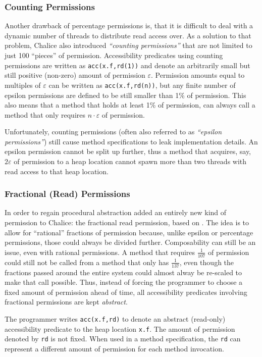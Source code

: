 \subsubsection{Counting Permissions}
Another drawback of percentage permissions is, that it is difficult to deal with a dynamic number of threads to distribute read access over.
As a solution to that problem, Chalice also introduced \emph{``counting permissions''} that are not limited to just 100 ``pieces'' of permission.
Accessibility predicates using counting permissions are written as \lstinline!acc(x.f,rd(1))! and denote an arbitrarily small but still positive (non-zero) amount of permission $\varepsilon$. 
Permission amounts equal to multiples of $\varepsilon$ can be written as \lstinline!acc(x.f,rd(n))!, but any finite number of epsilon permissions are defined to be still smaller than 1\% of permission.
This also means that a method that holds at least 1\% of permission, can always call a method that only requires $n\cdot{}\varepsilon$ of permission.

Unfortunately, counting permissions (often also referred to as \emph{``epsilon permissions''}) still cause method specifications to leak implementation details. 
An epsilon permission cannot be split up further, thus a method that acquires, say, $2 \varepsilon$ of permission to a heap location cannot spawn more than two threads with read access to that heap location.

\subsubsection{Fractional (Read) Permissions}
In order to regain procedural abstraction \cite{HLMS11} added an entirely new kind of permission to Chalice: the fractional read permission, based on \cite{Boy03}. 
The idea is to allow for ``rational'' fractions of permission because, unlike epsilon or percentage permissions, those could always be divided further. 
Composability can still be an issue, even with rational permissions. 
A method that requires $\tfrac{1}{107}$ of permission could still not be called from a method that only has $\tfrac{1}{137}$, even though the fractions passed around the entire system could almost alway be re-scaled to make that call possible.
Thus, instead of forcing the programmer to choose a fixed amount of permission ahead of time, all accessibility predicates involving fractional permissions are kept \emph{abstract}.

The programmer writes \lstinline!acc(x.f,rd)! to denote an abstract (read-only) accessibility predicate to the heap location \lstinline!x.f!. 
The amount of permission denoted by \lstinline!rd! is not fixed. 
When used in a method specification, the \lstinline!rd! can represent a different amount of permission for each method invocation.


